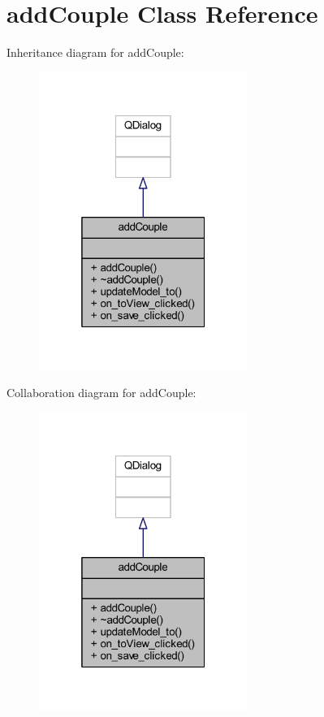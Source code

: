 \hypertarget{classadd_couple}{}\section{add\+Couple Class Reference}
\label{classadd_couple}


Inheritance diagram for add\+Couple\+:
\nopagebreak
\begin{figure}[H]
\begin{center}
\leavevmode
\includegraphics[width=193pt]{classadd_couple__inherit__graph}
\end{center}
\end{figure}


Collaboration diagram for add\+Couple\+:
\nopagebreak
\begin{figure}[H]
\begin{center}
\leavevmode
\includegraphics[width=193pt]{classadd_couple__coll__graph}
\end{center}
\end{figure}
